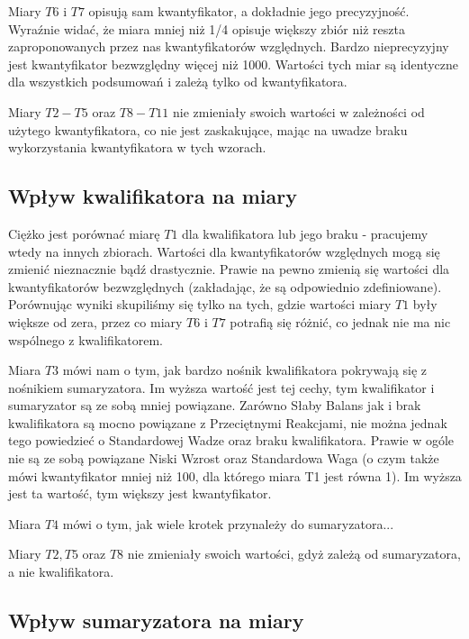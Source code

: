 \documentclass{classrep}
\begin{document}
Miary $T6$ i $T7$ opisują sam kwantyfikator, a dokładnie jego precyzyjność. Wyraźnie widać, że miara mniej niż 1/4 opisuje większy zbiór niż reszta zaproponowanych przez nas kwantyfikatorów względnych. Bardzo nieprecyzyjny jest kwantyfikator bezwzględny więcej niż 1000. Wartości tych miar są identyczne dla wszystkich podsumowań i zależą tylko od kwantyfikatora.
\newline

Miary $T2-T5$ oraz $T8-T11$ nie zmieniały swoich wartości w zależności od użytego kwantyfikatora, co nie jest zaskakujące, mając na uwadze braku wykorzystania kwantyfikatora w tych wzorach. 

\subsection{Wpływ kwalifikatora na miary}
Ciężko jest porównać miarę $T1$ dla kwalifikatora lub jego braku - pracujemy wtedy na innych zbiorach. Wartości dla kwantyfikatorów względnych mogą się zmienić nieznacznie bądź drastycznie. Prawie na pewno zmienią się wartości dla kwantyfikatorów bezwzględnych (zakładając, że są odpowiednio zdefiniowane). Porównując wyniki skupiliśmy się tylko na tych, gdzie wartości miary $T1$ były większe od zera, przez co miary $T6$ i $T7$ potrafią się różnić, co jednak nie ma nic wspólnego z kwalifikatorem.
\newline

Miara $T3$ mówi nam o tym, jak bardzo nośnik kwalifikatora pokrywają się z nośnikiem sumaryzatora. Im wyższa wartość jest tej cechy, tym kwalifikator i sumaryzator są ze sobą mniej powiązane. Zarówno Słaby Balans jak i brak kwalifikatora są mocno powiązane z Przeciętnymi Reakcjami, nie można jednak tego powiedzieć o Standardowej Wadze oraz braku kwalifikatora. Prawie w ogóle nie są ze sobą powiązane Niski Wzrost oraz Standardowa Waga (o czym także mówi kwantyfikator mniej niż 100, dla którego miara T1 jest równa 1). Im wyższa jest ta wartość, tym większy jest kwantyfikator.

Miara $T4$ mówi o tym, jak wiele krotek przynależy do sumaryzatora...

Miary $T2, T5$ oraz $T8$ nie zmieniały swoich wartości, gdyż zależą od sumaryzatora, a nie kwalifikatora. 

\subsection{Wpływ sumaryzatora na miary}
\end{document}
